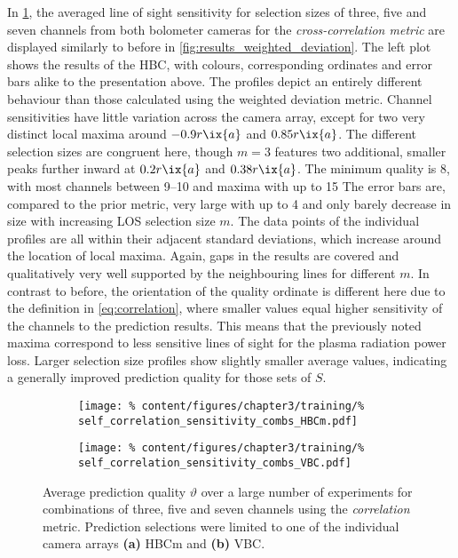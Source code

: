                 In \cref{fig:results_correlation}, the averaged line of sight sensitivity for selection sizes of three, five and seven channels from both bolometer cameras for the \textit{cross-correlation metric} are displayed similarly to before in \cref{fig:results_weighted_deviation}. The left plot shows the results of the HBC, with colours, corresponding ordinates and error bars alike to the presentation above. The profiles depict an entirely different behaviour than those calculated using the weighted deviation metric. Channel sensitivities have little variation across the camera array, except for two very distinct local maxima around $-0.9r\ix{a}$ and $0.85r\ix{a}$. The different selection sizes are congruent here, though $m=3$ features two additional, smaller peaks further inward at $0.2r\ix{a}$ and $0.38r\ix{a}$. The minimum quality is \SI{8}{\arbitraryunit}, with most channels between \SIrange{9}{10}{\arbitraryunit} and maxima with up to \SI{15}{\arbitraryunit} The error bars are, compared to the prior metric, very large with up to \SI{4}{\arbitraryunit} and only barely decrease in size with increasing LOS selection size $m$. The data points of the individual profiles are all within their adjacent standard deviations, which increase around the location of local maxima. Again, gaps in the results are covered and qualitatively very well supported by the neighbouring lines for different $m$. In contrast to before, the orientation of the quality ordinate is different here due to the definition in \cref{eq:correlation}, where smaller values equal higher sensitivity of the channels to the prediction results. This means that the previously noted maxima correspond to less sensitive lines of sight for the plasma radiation power loss. Larger selection size profiles show slightly smaller average values, indicating a generally improved prediction quality for those sets of $S$.\\%
%
                \begin{figure}[t]%
                    \centering%
                    \begin{subfigure}{0.47\textwidth}%
                        \texttt{[image: \%
                            content/figures/chapter3/training/\%
                            self\_correlation\_sensitivity\_combs\_HBCm.pdf]}%
                        \caption{}%
                    \end{subfigure}%
                    \hfill%
                    \begin{subfigure}{0.47\textwidth}%
                        \texttt{[image: \%
                            content/figures/chapter3/training/\%
                            self\_correlation\_sensitivity\_combs\_VBC.pdf]}%
                        \caption{}%
                    \end{subfigure}%
                    \caption{Average prediction quality $\vartheta$ over a large number of experiments for combinations of three, five and seven channels using the \textit{correlation} metric. Prediction selections were limited to one of the individual camera arrays \textbf{(a)} HBCm and \textbf{(b)} VBC.}\label{fig:results_correlation}%
                \end{figure}%
